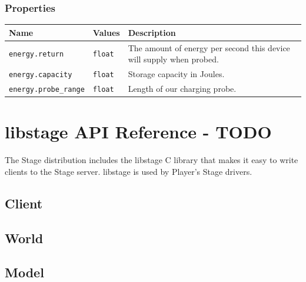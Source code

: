 \documentclass[letter,11pt,twoside]{report}
\begin{document}
\subsection*{Properties}
\begin{tabularx}{\columnwidth}{llX}
\hline Name & Values & Description \\ 
\hline 

\verb'energy.return' & \verb'float' & The amount of energy per second
this device will supply when probed. \\
\verb'energy.capacity' & \verb'float' & Storage capacity in Joules.\\
\verb'energy.probe_range' & \verb'float' & Length of our charging probe.\\
\hline
\end{tabularx}

\chapter{libstage API Reference - TODO}

The Stage distribution includes the libstage C library that makes it
easy to write clients to the Stage server. libstage is used by
Player's Stage drivers.


\section{Client}

\section{World}

\section{Model}




\end{document}
